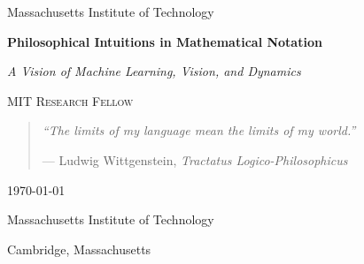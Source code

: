 \begin{titlepage}
	\centering
	\vspace*{1cm}
	
	{\Huge\color{mitred}Massachusetts Institute of Technology}
	
	\vspace{1.5cm}
	{\Huge\bfseries Philosophical Intuitions in Mathematical Notation\par}
	\vspace{0.5cm}
	{\Large\itshape A Vision of Machine Learning, Vision, and Dynamics\par}
	
	\vspace{2cm}
	{\Large\scshape MIT Research Fellow\par}
	
	\vfill
	
	\begin{quote}
		\itshape
		``The limits of my language mean the limits of my world.''
		
		\raggedleft--- Ludwig Wittgenstein, \textit{Tractatus Logico-Philosophicus}
	\end{quote}
	
	\vfill
	
	{\large \today\par}
	
	\vspace{1cm}
	{\footnotesize Massachusetts Institute of Technology\par}
	{\footnotesize Cambridge, Massachusetts\par}
\end{titlepage}

\clearpage
\thispagestyle{empty}
\mbox{}
\clearpage
